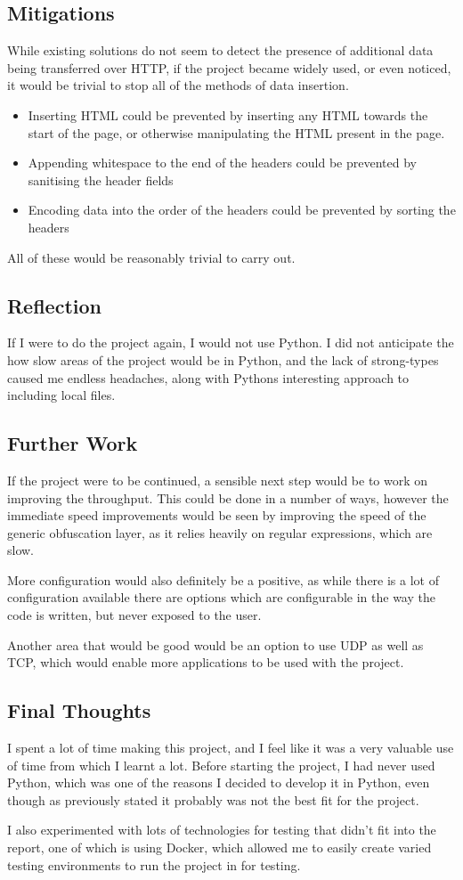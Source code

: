\subsection{Mitigations}
While existing solutions do not seem to detect the presence of additional data being transferred over HTTP, if the project became widely used, or even noticed, it would be trivial to stop all of the methods of data insertion.\par
\begin{itemize}
    \item Inserting HTML could be prevented by inserting any HTML towards the start of the page, or otherwise manipulating the HTML present in the page.
    \item Appending whitespace to the end of the headers could be prevented by sanitising the header fields
    \item Encoding data into the order of the headers could be prevented by sorting the headers
\end{itemize}
All of these would be reasonably trivial to carry out.

\subsection{Reflection}
If I were to do the project again, I would not use Python. I did not anticipate the how slow areas of the project would be in Python, and the lack of strong-types caused me endless headaches, along with Pythons interesting approach to including local files.
\subsection{Further Work}
If the project were to be continued, a sensible next step would be to work on improving the throughput. This could be done in a number of ways, however the immediate speed improvements would be seen by improving the speed of the generic obfuscation layer, as it relies heavily on regular expressions, which are slow.\par
More configuration would also definitely be a positive, as while there is a lot of configuration available there are options which are configurable in the way the code is written, but never exposed to the user.\par
Another area that would be good would be an option to use UDP as well as TCP, which would enable more applications to be used with the project.
\subsection{Final Thoughts}
I spent a lot of time making this project, and I feel like it was a very valuable use of time from which I learnt a lot. Before starting the project, I had never used Python, which was one of the reasons I decided to develop it in Python, even though as previously stated it probably was not the best fit for the project.\par
I also experimented with lots of technologies for testing that didn't fit into the report, one of which is using Docker, which allowed me to easily create varied testing environments to run the project in for testing.
